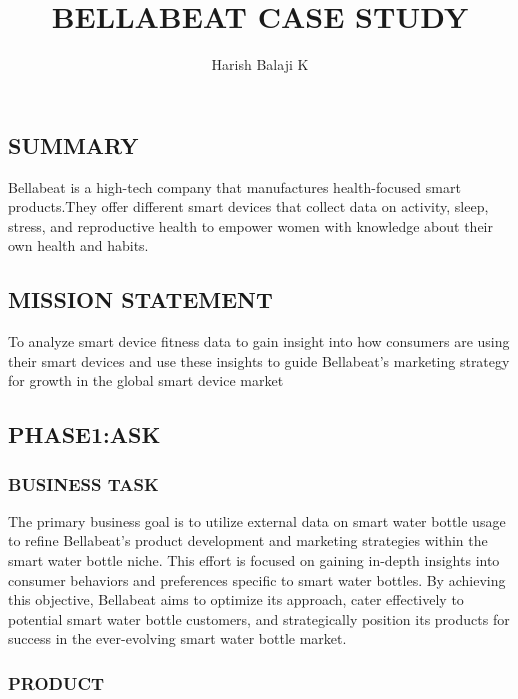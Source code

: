 \documentclass[
]{article}
\title{BELLABEAT CASE STUDY}
\author{Harish Balaji K}
\date{}
\begin{document}
\maketitle

{
\setcounter{tocdepth}{2}
\tableofcontents
}
\hypertarget{summary}{%
\subsection{SUMMARY}\label{summary}}

Bellabeat is a high-tech company that manufactures health-focused smart
products.They offer different smart devices that collect data on
activity, sleep, stress, and reproductive health to empower women with
knowledge about their own health and habits.

\hypertarget{mission-statement}{%
\subsection{MISSION STATEMENT}\label{mission-statement}}

To analyze smart device fitness data to gain insight into how consumers
are using their smart devices and use these insights to guide
Bellabeat's marketing strategy for growth in the global smart device
market

\hypertarget{phase1ask}{%
\subsection{PHASE1:ASK}\label{phase1ask}}

\hypertarget{business-task}{%
\subsubsection{BUSINESS TASK}\label{business-task}}

The primary business goal is to utilize external data on smart water
bottle usage to refine Bellabeat's product development and marketing
strategies within the smart water bottle niche. This effort is focused
on gaining in-depth insights into consumer behaviors and preferences
specific to smart water bottles. By achieving this objective, Bellabeat
aims to optimize its approach, cater effectively to potential smart
water bottle customers, and strategically position its products for
success in the ever-evolving smart water bottle market.

\hypertarget{product}{%
\subsubsection{PRODUCT}\label{product}}
\end{document}
